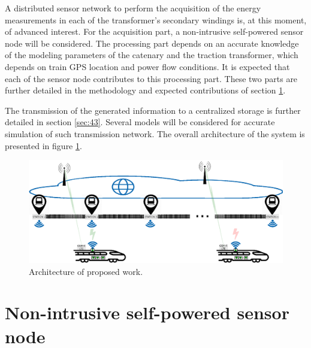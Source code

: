 A distributed sensor network to perform the acquisition of the energy measurements in each of the transformer's secondary windings is, at this moment, of advanced interest.
For the acquisition part, a non-intrusive self-powered sensor node will be considered.
The processing part depends on an accurate knowledge of the modeling parameters of the catenary and the traction transformer, which depends on train GPS location and power flow conditions. 
It is expected that each of the sensor node contributes to this processing part.
These two parts are further detailed in the methodology and expected contributions of section \ref{sec:42}.



The transmission of the generated information to a centralized storage is further detailed in section \ref{sec:43}. Several models will be considered for accurate simulation of such transmission network. The overall architecture of the system is presented in figure \ref{fig:41architecture}.

\begin{figure}[h!]
	\centering
	\includegraphics[width=1.0\textwidth,keepaspectratio]{figures/40.Method/architecture}
	\caption{Architecture of proposed work.}
	\label{fig:41architecture}
\end{figure}







\section{Non-intrusive self-powered sensor node}
\label{sec:42}
